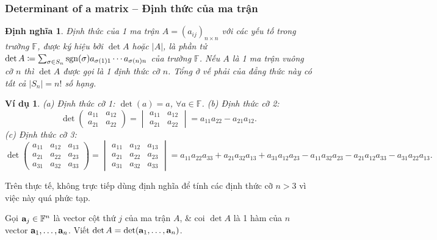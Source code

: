 \documentclass{article}
\newtheorem{dinhnghia}{Định nghĩa}
\newtheorem{vidu}{Ví dụ}
\begin{document}
\subsubsection{Determinant of a matrix -- Định thức của ma trận}
\begin{dinhnghia}
	{\rm Định thức} của 1 ma trận $A = (a_{ij})_{n\times n}$ với các yếu tố trong trường $\mathbb{F}$, được ký hiệu bởi $\det A$ hoặc $|A|$, là phần tử $\det A\coloneqq\sum_{\sigma\in S_n} {\rm sgn}(\sigma)a_{\sigma(1)1}\cdots a_{\sigma(n)n}$ của trường $\mathbb{F}$. Nếu $A$ là 1 ma trận vuông cỡ $n$ thì $\det A$ được gọi là 1 {\rm định thức cỡ $n$}. Tổng ở vế phải của đẳng thức này có tất cả $|S_n| = n!$ số hạng.
\end{dinhnghia}

\begin{vidu}
	(a) Định thức cỡ 1: $\det(a) = a$, $\forall a\in\mathbb{F}$. (b) Định thức cỡ 2:
	\begin{equation*}
		\det\begin{pmatrix}
			a_{11} & a_{12}\\a_{21} & a_{22}
		\end{pmatrix} = \begin{vmatrix}
			a_{11} & a_{12}\\a_{21} & a_{22}
		\end{vmatrix} = a_{11}a_{22} - a_{21}a_{12}.
	\end{equation*}
	(c) Định thức cỡ 3:
	\begin{equation*}
		\det\begin{pmatrix}
			a_{11} & a_{12} & a_{13}\\a_{21} & a_{22} & a_{23}\\a_{31} & a_{32} & a_{33}
		\end{pmatrix} = \begin{vmatrix}
			a_{11} & a_{12} & a_{13}\\a_{21} & a_{22} & a_{23}\\a_{31} & a_{32} & a_{33}
		\end{vmatrix} = a_{11}a_{22}a_{33} + a_{21}a_{32}a_{13} + a_{31}a_{12}a_{23} - a_{11}a_{32}a_{23} - a_{21}a_{12}a_{33} - a_{31}a_{22}a_{13}.
	\end{equation*}
\end{vidu}
Trên thực tế, không trực tiếp dùng định nghĩa để tính các định thức cỡ $n > 3$ vì việc này quá phức tạp.

Gọi ${\bf a}_j\in\mathbb{F}^n$ là vector cột thứ $j$ của ma trận $A$, \& coi $\det A$ là 1 hàm của $n$ vector ${\bf a}_1,\ldots,{\bf a}_n$. Viết $\det A = \det({\bf a}_1,\ldots,{\bf a}_n)$.
\end{document}
